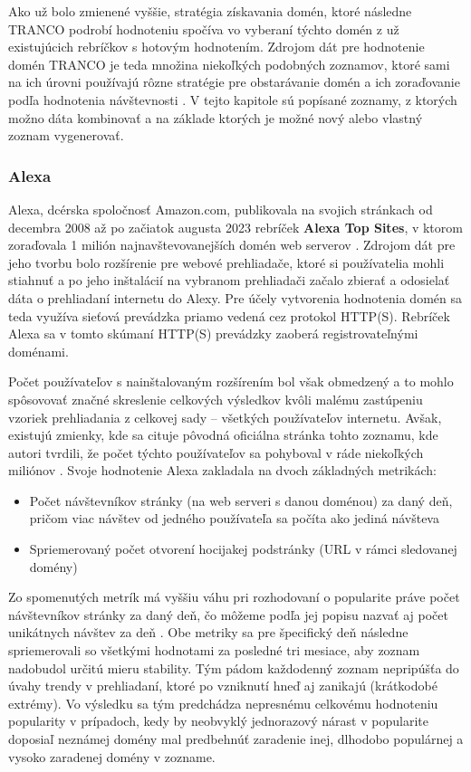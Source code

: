 Ako už bolo zmienené vyššie, stratégia získavania domén, ktoré následne TRANCO podrobí hodnoteniu spočíva vo vyberaní týchto domén z už existujúcich rebríčkov s hotovým hodnotením. 
Zdrojom dát pre hodnotenie domén TRANCO je teda množina niekoľkých podobných zoznamov, ktoré sami na ich úrovni používajú rôzne stratégie pre obstarávanie domén a ich zoraďovanie 
podľa hodnotenia návštevnosti \cite{tranco-methodology}. 
V tejto kapitole sú popísané zoznamy, z ktorých možno dáta kombinovať 
a na základe ktorých je možné nový alebo vlastný zoznam vygenerovať.

\subsubsection{Alexa}

Alexa, dcérska spoločnosť Amazon.com, publikovala na svojich stránkach od decembra 2008 až po začiatok augusta 2023 rebríček \textbf{Alexa Top Sites}, v ktorom zoraďovala 1 milión 
najnavštevovanejších domén web serverov \cite{tranco-methodology}.
Zdrojom dát pre jeho tvorbu bolo rozšírenie pre webové prehliadače, ktoré si používatelia mohli stiahnuť a po jeho inštalácií na vybranom prehliadači začalo zbierať a odosielať
dáta o prehliadaní internetu do Alexy. 
Pre účely vytvorenia hodnotenia domén sa teda využíva sieťová prevádzka priamo vedená cez protokol HTTP(S). 
Rebríček Alexa sa v tomto skúmaní HTTP(S) prevádzky zaoberá registrovateľnými doménami. 

Počet používateľov s nainštalovaným rozšírením bol však obmedzený 
a to mohlo spôsovovať značné skreslenie celkových výsledkov kvôli malému zastúpeniu vzoriek prehliadania z celkovej sady -- všetkých používateľov internetu. 
Avšak, existujú zmienky, kde sa cituje pôvodná oficiálna stránka tohto zoznamu, kde autori tvrdili, že počet týchto používateľov sa pohyboval v ráde niekoľkých miliónov \cite{tranco}.
Svoje hodnotenie Alexa zakladala na dvoch základných metrikách: \cite{kinsta-alexa-rank-article, tranco}
\begin{itemize}
    \item Počet návštevníkov stránky (na web serveri s danou doménou) za daný deň, pričom viac návštev od jedného používateľa sa počíta ako jediná návšteva
    \item Spriemerovaný počet otvorení hocijakej podstránky (URL v rámci sledovanej domény)
\end{itemize}

Zo spomenutých metrík má vyššiu váhu pri rozhodovaní o popularite práve počet návštevníkov stránky za daný deň, čo môžeme podľa jej popisu nazvať aj počet unikátnych návštev za deň \cite{tranco}.
Obe metriky sa pre špecifický deň následne spriemerovali so všetkými hodnotami za posledné tri mesiace, aby zoznam nadobudol určitú mieru stability. 
Tým pádom každodenný zoznam nepripúšťa do úvahy trendy v prehliadaní, ktoré po vzniknutí hneď aj zanikajú (krátkodobé extrémy). 
Vo výsledku sa tým predchádza nepresnému celkovému hodnoteniu popularity v prípadoch, 
kedy by neobvyklý jednorazový nárast v popularite doposiaľ neznámej domény mal predbehnúť zaradenie inej, dlhodobo populárnej a vysoko zaradenej domény v zozname. 

